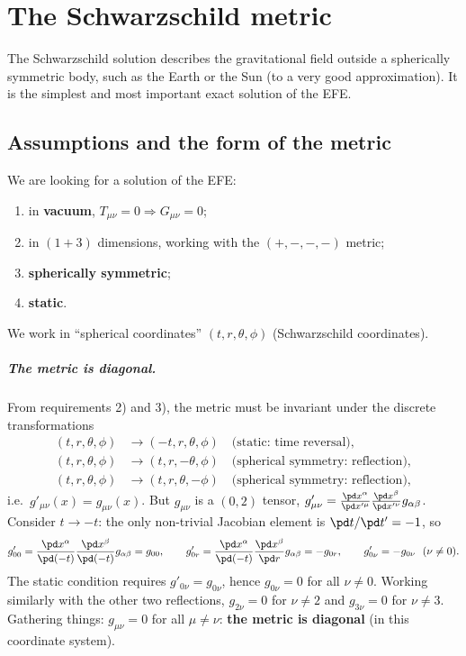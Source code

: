 \chapter{The Schwarzschild metric}\label{ch:schwarzschild}

The Schwarzschild solution describes the gravitational field outside a spherically symmetric body, such as the Earth or the Sun (to a very good approximation). It is the simplest and most important exact solution of the EFE.

\section{Assumptions and the form of the metric}

We are looking for a solution of the EFE:
\begin{enumerate}[label=\arabic*),start=0,nosep]
\item in \textbf{vacuum}, $T_{\mu\nu}=0\Rightarrow G_{\mu\nu}=0$;
\item in $(1+3)$ dimensions, working with the $(+,-,-,-)$ metric;
\item \textbf{spherically symmetric};
\item \textbf{static}.
\end{enumerate}
We work in ``spherical coordinates'' $(t,r,\theta,\phi)$ (Schwarzschild coordinates).

\paragraph{The metric is diagonal.} From requirements 2) and 3), the metric must be invariant under the discrete transformations
\begin{align*}
  (t,r,\theta,\phi)&\to(-t,r,\theta,\phi)\quad\text{(static: time reversal)},\\
  (t,r,\theta,\phi)&\to(t,r,-\theta,\phi)\quad\text{(spherical symmetry: reflection)},\\
  (t,r,\theta,\phi)&\to(t,r,\theta,-\phi)\quad\text{(spherical symmetry: reflection)},
\end{align*}
i.e.\ $g'_{\mu\nu}(x)=g_{\mu\nu}(x)$. But $g_{\mu\nu}$ is a $(0,2)$ tensor, $g'_{\mu\nu}=\frac{\pd x^\alpha}{\pd x'^\mu}\frac{\pd x^\beta}{\pd x'^\nu}g_{\alpha\beta}$. Consider $t\to-t$: the only non-trivial Jacobian element is $\pd t/\pd t'=-1$, so
\[
  g'_{00}=\frac{\pd x^\alpha}{\pd(-t)}\frac{\pd x^\beta}{\pd(-t)}g_{\alpha\beta}=g_{00},\qquad
  g'_{0r}=\frac{\pd x^\alpha}{\pd(-t)}\frac{\pd x^\beta}{\pd r}g_{\alpha\beta}=-g_{0r},\qquad g'_{0\nu}=-g_{0\nu}\ \ (\nu\neq0).
\]
The static condition requires $g'_{0\nu}=g_{0\nu}$, hence $g_{0\nu}=0$ for all $\nu\neq0$. Working similarly with the other two reflections, $g_{2\nu}=0$ for $\nu\neq2$ and $g_{3\nu}=0$ for $\nu\neq3$. Gathering things: $g_{\mu\nu}=0$ for all $\mu\neq\nu$: \textbf{the metric is diagonal} (in this coordinate system).

